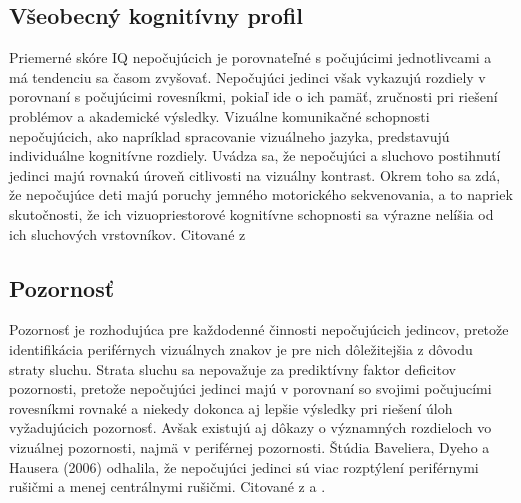 \documentclass[10pt,twoside,slovak,a4paper]{article}
\begin{document}
\subsection{Všeobecný kognitívny profil} \label{rozdiely:vseob}
Priemerné skóre IQ nepočujúcich je porovnateľné s počujúcimi jednotlivcami a má tendenciu sa časom zvyšovať. Nepočujúci jedinci však vykazujú rozdiely v porovnaní s počujúcimi rovesníkmi, pokiaľ ide o ich pamäť, zručnosti pri riešení problémov a akademické výsledky. Vizuálne komunikačné schopnosti nepočujúcich, ako napríklad spracovanie vizuálneho jazyka, predstavujú individuálne kognitívne rozdiely. Uvádza sa, že nepočujúci a sluchovo postihnutí jedinci majú rovnakú úroveň citlivosti na vizuálny kontrast. Okrem toho sa zdá, že nepočujúce deti majú poruchy jemného motorického sekvenovania, a to napriek skutočnosti, že ich vizuopriestorové kognitívne schopnosti sa výrazne nelíšia od ich sluchových vrstovníkov.
Citované z \cite{pappas2018learning}


\subsection{Pozornosť} \label{rozdiely:pozornost}
Pozornosť je rozhodujúca pre každodenné činnosti nepočujúcich jedincov, pretože identifikácia periférnych vizuálnych znakov je pre nich dôležitejšia z dôvodu straty sluchu. Strata sluchu sa nepovažuje za prediktívny faktor deficitov pozornosti, pretože nepočujúci jedinci majú v porovnaní so svojimi počujucími rovesníkmi rovnaké a niekedy dokonca aj lepšie výsledky pri riešení úloh vyžadujúcich pozornosť. Avšak existujú aj dôkazy o významných rozdieloch vo vizuálnej pozornosti, najmä v periférnej pozornosti. Štúdia Baveliera, Dyeho a Hausera (2006) odhalila, že nepočujúci jedinci sú viac rozptýlení periférnymi rušičmi a menej centrálnymi rušičmi.
Citované z \cite{bavelier2006deaf} a \cite{pappas2018learning}.
\end{document}
